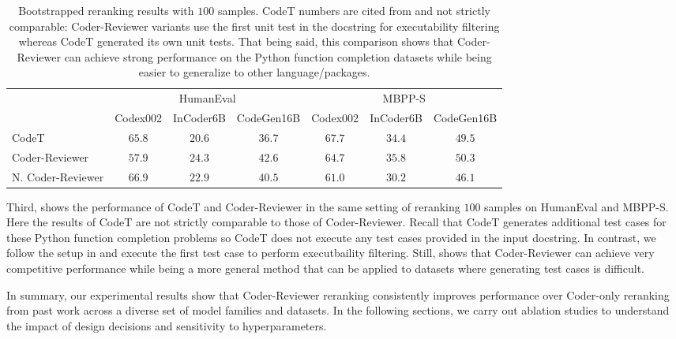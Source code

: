 \documentclass[nohyperref]{article}
\theoremstyle{plain}
\theoremstyle{definition}
\theoremstyle{remark}
\begin{document}
\begin{table*}[]
\setlength{\tabcolsep}{2.2pt}
\centering
\footnotesize
\begin{tabular}{lcccccc}
\toprule
{} & \multicolumn{3}{c}{HumanEval} & \multicolumn{3}{c}{MBPP-S} \\
\cmidrule(lr){2-4}\cmidrule(lr){5-7}
{} &  Codex002 & InCoder6B & CodeGen16B & Codex002 & InCoder6B & CodeGen16B \\
\midrule
CodeT   &    $65.8$ &    $20.6$ &     $36.7$ &   $67.7$ &    $34.4$ &     $49.5$ \\
\midrule
Coder-Reviewer       &    $57.9$ &    $24.3$ &     $42.6$ &   $64.7$ &    $35.8$ &     $50.3$ \\
N. Coder-Reviewer &    $66.9$ &    $22.9$ &     $40.5$ &   $61.0$ &    $30.2$ &     $46.1$ \\
\bottomrule
\end{tabular} \caption{Bootstrapped reranking results with $100$ samples. CodeT numbers are cited from \citet{codet} and not strictly comparable: Coder-Reviewer variants use the first unit test in the docstring for executability filtering whereas CodeT generated its own unit tests.
That being said, this comparison shows that Coder-Reviewer can achieve strong performance on the Python function completion datasets while being easier to generalize to other language/packages.
}
\vspace{-10pt}
\label{tab:codt_table}
\end{table*}

Third,  shows the performance of CodeT and Coder-Reviewer in the same setting of reranking $100$ samples on HumanEval and MBPP-S.
Here the results of CodeT are not strictly comparable to those of Coder-Reviewer.
Recall that CodeT generates additional test cases for these Python function completion problems so CodeT does not execute any test cases provided in the input docstring.
In contrast, we follow the setup in \citet{mbr} and execute the first test case to perform executbaility filtering.
Still,  shows that Coder-Reviewer can achieve very competitive performance while being a more general method that can be applied to datasets where generating test cases is difficult.

In summary, our experimental results show that Coder-Reviewer reranking consistently improves performance over Coder-only reranking from past work across a diverse set of model families and datasets.
In the following sections, we carry out ablation studies to understand the impact of design decisions and sensitivity to hyperparameters.
\end{document}
